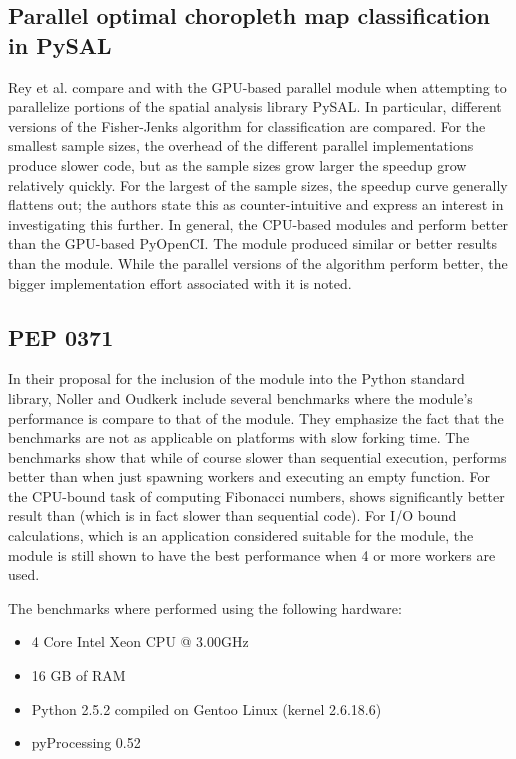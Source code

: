 \subsection{Parallel optimal choropleth map classification in PySAL}
Rey et al. \cite{rey_2013_parallel_pocmcip} compare  and  with the GPU-based parallel
module  when attempting to parallelize portions of the spatial analysis library PySAL. In particular, different
versions of the Fisher-Jenks algorithm for classification are compared. For the smallest sample sizes, the overhead of the
different parallel implementations produce slower code, but as the sample sizes grow larger the speedup grow relatively quickly.
For the largest of the sample sizes, the speedup curve generally flattens out; the authors state this as counter-intuitive and
express an interest in investigating this further. In general, the CPU-based modules  and 
perform better than the GPU-based PyOpenCI. The  module produced similar or better results than the
 module.
While the parallel versions of the algorithm perform better, the bigger implementation effort associated with it is noted.

\subsection{PEP 0371}
In their proposal for the inclusion of the  module into the Python standard library,
Noller and Oudkerk \cite{noller_pep_p0} include several benchmarks where the  module's performance is compare to
that of the  module. They emphasize the fact that the benchmarks are not as applicable on platforms with slow forking
time. The benchmarks show that while of course slower than sequential execution,  performs better than
 when just spawning workers and executing an empty function. For the CPU-bound task of computing Fibonacci numbers,
 shows significantly better result than  (which is in fact slower than sequential code). For I/O bound
calculations, which is an application considered suitable for the  module, the  module is still shown to have
the best performance when 4 or more workers are used.

The benchmarks where performed using the following hardware:
\begin{itemize}
  \item 4 Core Intel Xeon CPU @ 3.00GHz
  \item 16 GB of RAM
  \item Python 2.5.2 compiled on Gentoo Linux (kernel 2.6.18.6)
  \item pyProcessing 0.52
\end{itemize}

